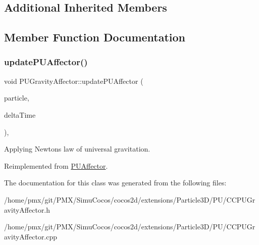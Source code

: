 \subsection*{Additional Inherited Members}


\subsection{Member Function Documentation}
\mbox{\label{classPUGravityAffector_abf3586107daa7e03a11cdc346652132f}} 
\subsubsection{\texorpdfstring{update\+P\+U\+Affector()}{updatePUAffector()}}
{\footnotesize\ttfamily void P\+U\+Gravity\+Affector\+::update\+P\+U\+Affector (\begin{DoxyParamCaption}\item[{\hyperlink{structPUParticle3D}{P\+U\+Particle3D} $\ast$}]{particle,  }\item[{float}]{delta\+Time }\end{DoxyParamCaption})\hspace{0.3cm}{\ttfamily [override]}, {\ttfamily [virtual]}}

Applying Newton\textquotesingle{}s law of universal gravitation. 

Reimplemented from \hyperlink{classPUAffector}{P\+U\+Affector}.



The documentation for this class was generated from the following files\+:\begin{DoxyCompactItemize}
\item 
/home/pmx/git/\+P\+M\+X/\+Simu\+Cocos/cocos2d/extensions/\+Particle3\+D/\+P\+U/C\+C\+P\+U\+Gravity\+Affector.\+h\item 
/home/pmx/git/\+P\+M\+X/\+Simu\+Cocos/cocos2d/extensions/\+Particle3\+D/\+P\+U/C\+C\+P\+U\+Gravity\+Affector.\+cpp\end{DoxyCompactItemize}
